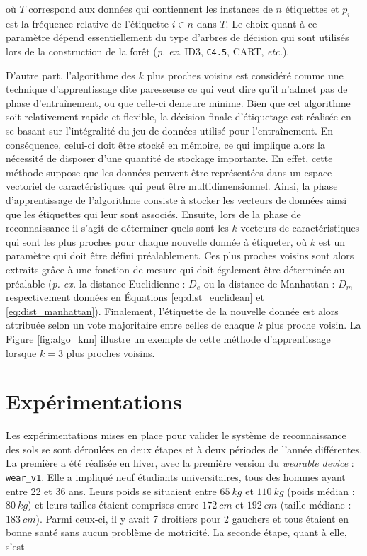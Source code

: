 \noindent où $T$ correspond aux données qui contiennent les instances de $n$ étiquettes et $p_i$ est la fréquence relative de l'étiquette $i \in n$ dans $T$. Le choix quant à ce paramètre dépend essentiellement du type d'arbres de décision qui sont utilisés lors de la construction de la forêt (\textit{p. ex.} ID3, \texttt{C4.5}, CART, \textit{etc.}).

D'autre part, l'algorithme des $k$ plus proches voisins est considéré comme une technique d'apprentissage dite \og{}paresseuse\fg{} ce qui veut dire qu'il n'admet pas de phase d'entraînement, ou que celle-ci demeure minime. Bien que cet algorithme soit relativement rapide et flexible, la décision finale d'étiquetage est réalisée en se basant sur l'intégralité du jeu de données utilisé pour l'entraînement. En conséquence, celui-ci doit être stocké en mémoire, ce qui implique alors la nécessité de disposer d'une quantité de stockage importante. En effet, cette méthode suppose que les données peuvent être représentées dans un espace vectoriel de caractéristiques qui peut être multidimensionnel. Ainsi, la phase d'apprentissage de l'algorithme consiste à stocker les vecteurs de données ainsi que les étiquettes qui leur sont associés. Ensuite, lors de la phase de reconnaissance il s'agit de déterminer quels sont les $k$ vecteurs de caractéristiques qui sont les plus proches pour chaque nouvelle donnée à étiqueter, où $k$ est un paramètre qui doit être défini préalablement. Ces plus proches voisins sont alors extraits grâce à une fonction de mesure qui doit également être déterminée au préalable (\textit{p. ex.} la distance Euclidienne : $D_e$ ou la distance de Manhattan : $D_m$ respectivement données en Équations \ref{eq:dist_euclidean} et \ref{eq:dist_manhattan}). Finalement, l'étiquette de la nouvelle donnée est alors attribuée selon un vote majoritaire entre celles de chaque $k$ plus proche voisin. La Figure \ref{fig:algo_knn} illustre un exemple de cette méthode d'apprentissage lorsque $k=3$ plus proches voisins.

\section{Expérimentations}
\label{sec:expe}

Les expérimentations mises en place pour valider le système de reconnaissance des sols se sont déroulées en deux étapes et à deux périodes de l'année différentes. La première a été réalisée en hiver, avec la première version du \textit{wearable device} : \texttt{wear\_v1}. Elle a impliqué neuf étudiants universitaires, tous des hommes ayant entre 22 et 36 ans. Leurs poids se situaient entre $65\:kg$ et $110\:kg$ (poids médian : $80\:kg$) et leurs tailles étaient comprises entre $172\:cm$ et $192\:cm$ (taille médiane : $183\:cm$). Parmi ceux-ci, il y avait 7 droitiers pour 2 gauchers et tous étaient en bonne santé sans aucun problème de motricité. La seconde étape, quant à elle, s'est

